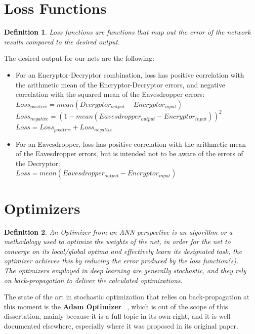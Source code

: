 \documentclass[a4paper, 12pt]{report}
\newcommand\tab[1][1cm]{\hspace*{#1}}
\newtheorem{definition}{Definition}
\begin{document}
\section{\textbf{Loss Functions}}
\begin{definition}
	Loss functions are functions that map out the error of the network results compared to the desired output.
\end{definition}
The desired output for our nets are the following:
\begin{itemize}[nosep]
	\item For an Encryptor-Decryptor combination, loss has positive correlation with the arithmetic mean of the Encryptor-Decryptor errors, and negative correlation with the squared mean of the Eavesdropper errors:\\
	\tab $ Loss_{positive} = mean(Decryptor_{output} - Encryptor_{input}) $\\
	\tab $ Loss_{negative} = (1 - mean(Eavesdropper_{output} - Encryptor_{input}))^{2} $\\
	\tab $ Loss = Loss_{positive} + Loss_{negative} $
	\item For an Eavesdropper, loss has positive correlation with the arithmetic mean of the Eavesdropper errors, but is intended not to be aware of the errors of the Decryptor:\\
	\tab $ Loss = mean(Eavesdropper_{output} - Encryptor_{input}) $
\end{itemize}
\section{\textbf{Optimizers}}
\begin{definition}
	An Optimizer from an ANN perspective is an algorithm or a methodology used to optimize the weights of the net, in order for the net to converge on its local/global optima and effectively learn its designated task, the optimizer achieves this by reducing the error produced by the loss function(s).\\
	The optimizers employed in deep learning are generally stochastic, and they rely on back-propagation to deliver the calculated optimizations. 
\end{definition}
The state of the art in stochastic optimization that relies on back-propagation at this moment is the \textbf{Adam Optimizer} ~\citep{DBLP:journals/corr/KingmaB14}, which is out of the scope of this dissertation, mainly because it is a full topic in its own right, and it is well documented elsewhere, especially where it was proposed in its original paper.
\newpage
\end{document}
